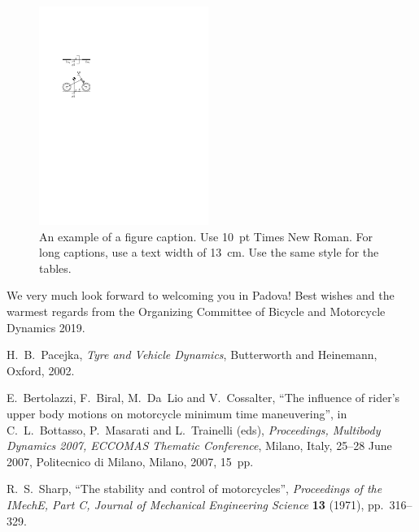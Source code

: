 \documentclass{bmd2019a}
\begin{document}
\begin{figure}[h!]
\begin{center}
  \includegraphics[width=55mm]{figure1}
  \caption{An example of a figure caption. Use 10~pt Times New Roman.
           For long captions, use a text width of 13~cm.
           Use the same style for the tables.} \label{fig:fig1}
\end{center}
\end{figure}


We very much look forward to welcoming you in Padova! Best wishes and the warmest regards from the Organizing Committee of Bicycle and Motorcycle Dynamics 2019.


% 
% 
\begin{thebibliography}{6}
 H.~B.~Pacejka,
\textit{Tyre and Vehicle Dynamics},
Butterworth and Heinemann, Oxford, 2002.

 E.~Bertolazzi, F.~Biral, M.~Da~Lio and V.~Cossalter,
``The influence of rider's upper body motions on motorcycle minimum time
  maneuvering'',
in C.~L.~Bottasso, P.~Masarati and L.~Trainelli (eds),
\textit{Proceedings, Multibody Dynamics 2007, ECCOMAS Thematic Conference},
Milano, Italy, 25--28 June 2007,
Politecnico di Milano, Milano, 2007, 15~pp.

 R.~S.~Sharp,
``The stability and control of motorcycles'',
\textit{Proceedings of the IMechE, Part C, Journal of Mechanical Engineering
  Science} \textbf{13} (1971), pp.~316--329.

\end{thebibliography}
\end{document}
